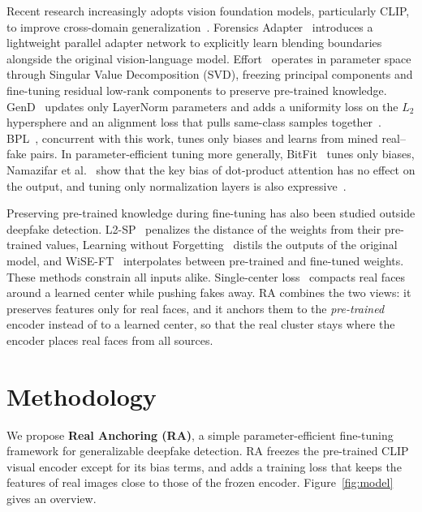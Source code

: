 \documentclass[fonts]{icst}
\begin{document}
Recent research increasingly adopts vision foundation models, particularly CLIP, to improve cross-domain generalization~\cite{ojha2023universal,cui2025forada,yan2025effort,yermakov2025gend}. Forensics Adapter~\cite{cui2025forada} introduces a lightweight parallel adapter network to explicitly learn blending boundaries alongside the original vision-language model. Effort~\cite{yan2025effort} operates in parameter space through Singular Value Decomposition (SVD), freezing principal components and fine-tuning residual low-rank components to preserve pre-trained knowledge. GenD~\cite{yermakov2025gend} updates only LayerNorm parameters and adds a uniformity loss on the $L_2$ hypersphere and an alignment loss that pulls same-class samples together~\cite{wang2020alignment}. BPL~\cite{xu2026bpl}, concurrent with this work, tunes only biases and learns from mined real--fake pairs. In parameter-efficient tuning more generally, BitFit~\cite{benzaken2022bitfit} tunes only biases, Namazifar et al.~\cite{namazifar2023bias} show that the key bias of dot-product attention has no effect on the output, and tuning only normalization layers is also expressive~\cite{giannou2023layernorm,wang2022ln,valizadeh2024layernorm}.

Preserving pre-trained knowledge during fine-tuning has also been studied outside deepfake detection. L2-SP~\cite{li2018l2sp} penalizes the distance of the weights from their pre-trained values, Learning without Forgetting~\cite{li2018lwf} distils the outputs of the original model, and WiSE-FT~\cite{wortsman2022wiseft} interpolates between pre-trained and fine-tuned weights. These methods constrain all inputs alike. Single-center loss~\cite{li2021scl} compacts real faces around a learned center while pushing fakes away. RA combines the two views: it preserves features only for real faces, and it anchors them to the \emph{pre-trained} encoder instead of to a learned center, so that the real cluster stays where the encoder places real faces from all sources.


\section{Methodology}
\label{sec:method}

We propose \textbf{Real Anchoring (RA)}, a simple parameter-efficient fine-tuning framework for generalizable deepfake detection. RA freezes the pre-trained CLIP visual encoder except for its bias terms, and adds a training loss that keeps the features of real images close to those of the frozen encoder. Figure~\ref{fig:model} gives an overview.
\end{document}
